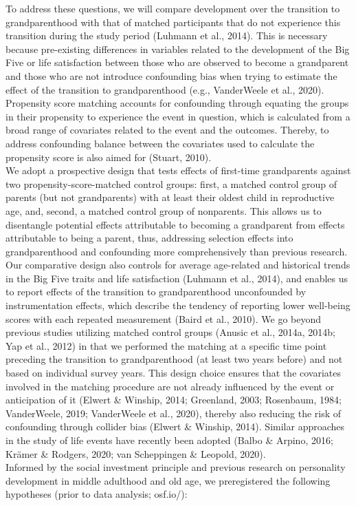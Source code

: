 \documentclass[
  english,
  man, noextraspace]{apa7}
\begin{document}
To address these questions, we will compare development over the transition to grandparenthood with that of matched participants that do not experience this transition during the study period (Luhmann et al., 2014). This is necessary because pre-existing differences in variables related to the development of the Big Five or life satisfaction between those who are observed to become a grandparent and those who are not introduce confounding bias when trying to estimate the effect of the transition to grandparenthood (e.g., VanderWeele et al., 2020). Propensity score matching accounts for confounding through equating the groups in their propensity to experience the event in question, which is calculated from a broad range of covariates related to the event and the outcomes. Thereby, to address confounding balance between the covariates used to calculate the propensity score is also aimed for (Stuart, 2010).\\
We adopt a prospective design that tests effects of first-time grandparents against two propensity-score-matched control groups: first, a matched control group of parents (but not grandparents) with at least their oldest child in reproductive age, and, second, a matched control group of nonparents. This allows us to disentangle potential effects attributable to becoming a grandparent from effects attributable to being a parent, thus, addressing selection effects into grandparenthood and confounding more comprehensively than previous research. Our comparative design also controls for average age-related and historical trends in the Big Five traits and life satisfaction (Luhmann et al., 2014), and enables us to report effects of the transition to grandparenthood unconfounded by instrumentation effects, which describe the tendency of reporting lower well-being scores with each repeated measurement (Baird et al., 2010). We go beyond previous studies utilizing matched control groups (Anusic et al., 2014a, 2014b; Yap et al., 2012) in that we performed the matching at a specific time point preceding the transition to grandparenthood (at least two years before) and not based on individual survey years. This design choice ensures that the covariates involved in the matching procedure are not already influenced by the event or anticipation of it (Elwert \& Winship, 2014; Greenland, 2003; Rosenbaum, 1984; VanderWeele, 2019; VanderWeele et al., 2020), thereby also reducing the risk of confounding through collider bias (Elwert \& Winship, 2014). Similar approaches in the study of life events have recently been adopted (Balbo \& Arpino, 2016; Krämer \& Rodgers, 2020; van Scheppingen \& Leopold, 2020).\\
Informed by the social investment principle and previous research on personality development in middle adulthood and old age, we preregistered the following hypotheses (prior to data analysis; osf.io/):
\end{document}
